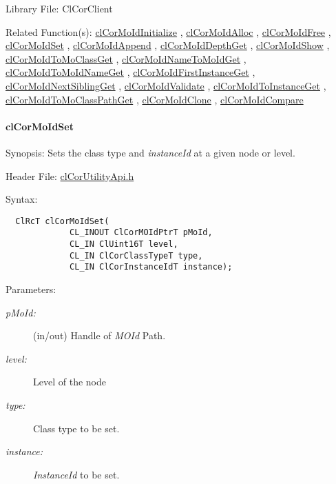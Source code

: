 \begin{Desc}
\item[Library File:]Cl\-Cor\-Client\end{Desc}
\begin{Desc}
\item[Related Function(s):]\hyperlink{group__group13}{cl\-Cor\-Mo\-Id\-Initialize} , \hyperlink{group__group13}{cl\-Cor\-Mo\-Id\-Alloc} , \hyperlink{group__group13}{cl\-Cor\-Mo\-Id\-Free} , \hyperlink{group__group13}{cl\-Cor\-Mo\-Id\-Set} , \hyperlink{group__group13}{cl\-Cor\-Mo\-Id\-Append} , \hyperlink{group__group13}{cl\-Cor\-Mo\-Id\-Depth\-Get} , \hyperlink{group__group13}{cl\-Cor\-Mo\-Id\-Show} , \hyperlink{group__group13}{cl\-Cor\-Mo\-Id\-To\-Mo\-Class\-Get} , \hyperlink{group__group13}{cl\-Cor\-Mo\-Id\-Name\-To\-Mo\-Id\-Get} , \hyperlink{group__group13}{cl\-Cor\-Mo\-Id\-To\-Mo\-Id\-Name\-Get} , \hyperlink{group__group13}{cl\-Cor\-Mo\-Id\-First\-Instance\-Get} , \hyperlink{group__group13}{cl\-Cor\-Mo\-Id\-Next\-Sibling\-Get} , \hyperlink{group__group13}{cl\-Cor\-Mo\-Id\-Validate} , \hyperlink{group__group13}{cl\-Cor\-Mo\-Id\-To\-Instance\-Get} , \hyperlink{group__group13}{cl\-Cor\-Mo\-Id\-To\-Mo\-Class\-Path\-Get} , \hyperlink{group__group13}{cl\-Cor\-Mo\-Id\-Clone} , \hyperlink{group__group13}{cl\-Cor\-Mo\-Id\-Compare} \end{Desc}
\hypertarget{pagecor232}{}\paragraph{cl\-Cor\-Mo\-Id\-Set}\label{pagecor232}
\begin{Desc}
\item[Synopsis:]Sets the class type and {\em instance\-Id\/} at a given node or level.\end{Desc}
\begin{Desc}
\item[Header File:]\hyperlink{cl_cor_utility_api_8h}{cl\-Cor\-Utility\-Api.h}\end{Desc}
\begin{Desc}
\item[Syntax:]

\footnotesize\begin{verbatim}  ClRcT clCorMoIdSet(
             CL_INOUT ClCorMOIdPtrT pMoId,
             CL_IN ClUint16T level,
             CL_IN ClCorClassTypeT type,
             CL_IN ClCorInstanceIdT instance);
\end{verbatim}
\normalsize
\end{Desc}
\begin{Desc}
\item[Parameters:]
\begin{description}
\item[{\em p\-Mo\-Id:}](in/out) Handle of {\em MOId\/} Path. \item[{\em level:}]Level of the node \item[{\em type:}]Class type to be set. \item[{\em instance:}]{\em Instance\-Id\/} to be set.\end{description}
\end{Desc}
